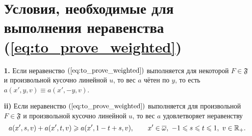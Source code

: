 \section{Условия, необходимые для выполнения неравенства (\ref{eq:to_prove_weighted})}


\begin{thm}
\label{thm:necessary_conditions_weighted}
\textbf{1.}
Если неравенство $(\ref{eq:to_prove_weighted})$ выполняется для некоторой $F \in \mathfrak{F}$ и произвольной кусочно линейной $u$,
то вес $a$ чётен по $y$, то есть $a(x', y, v) \equiv a(x', -y, v)$.

\textbf{\textup{ii)}}
Если неравенство $(\ref{eq:to_prove_weighted})$ выполняется для произвольной $F \in \mathfrak{F}$
и произвольной кусочно линейной $u$, то вес $a$ удовлетворяет неравенству
\begin{equation}
\label{eq:almostConcave}
a(x', s, v) + a(x', t, v) \ge a(x', 1 - t + s, v), \qquad x' \in \overline{\omega},\ -1 \le s \le t \le 1,\ v \in \Real_+.
\end{equation}
\end{thm}

